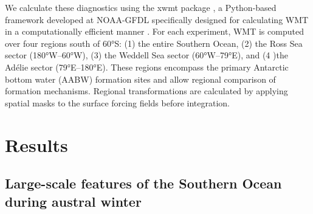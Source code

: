 \documentclass[draft]{agujournal2025}
\begin{document}
We calculate these diagnostics using the xwmt package \citep{xwmt2024}, a Python-based framework developed at NOAA-GFDL specifically designed for calculating WMT in a computationally efficient manner \citep{drake2025water}. For each experiment, WMT is computed over four regions south of 60°S: (1) the entire Southern Ocean, (2) the Ross Sea sector (180°W–60°W), (3) the Weddell Sea sector (60°W–79°E), and (4 )the Adélie sector (79°E–180°E). These regions encompass the primary Antarctic bottom water (AABW) formation sites and allow regional comparison of formation mechanisms. Regional transformations are calculated by applying spatial masks to the surface forcing fields before integration.




\section{Results}

\subsection{Large-scale features of the Southern Ocean during austral winter}
\end{document}
